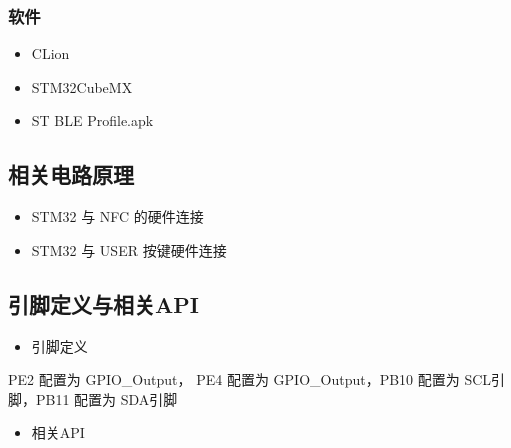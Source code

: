 \documentclass[a4paper,12pt,english]{sphinxmanual}
\begin{document}
\subsubsection{软件}
\label{\detokenize{exp-stm32/nfc:id4}}\begin{itemize}
\item {} 
\sphinxAtStartPar
CLion

\item {} 
\sphinxAtStartPar
STM32CubeMX

\item {} 
\sphinxAtStartPar
ST BLE Profile.apk

\end{itemize}


\subsection{相关电路原理}
\label{\detokenize{exp-stm32/nfc:id5}}\begin{itemize}
\item {} 
\sphinxAtStartPar
STM32 与 NFC 的硬件连接

\end{itemize}

\sphinxAtStartPar
{}

\sphinxAtStartPar
{}
\begin{itemize}
\item {} 
\sphinxAtStartPar
STM32 与 USER 按键硬件连接

\end{itemize}

\sphinxAtStartPar
{}


\subsection{引脚定义与相关API}
\label{\detokenize{exp-stm32/nfc:api}}\begin{itemize}
\item {} 
\sphinxAtStartPar
引脚定义

\end{itemize}

\sphinxAtStartPar
PE2 配置为 GPIO\_Output， PE4 配置为 GPIO\_Output，PB10 配置为 SCL引脚，PB11 配置为 SDA引脚
\begin{itemize}
\item {} 
\sphinxAtStartPar
相关API

\end{itemize}
\end{document}
